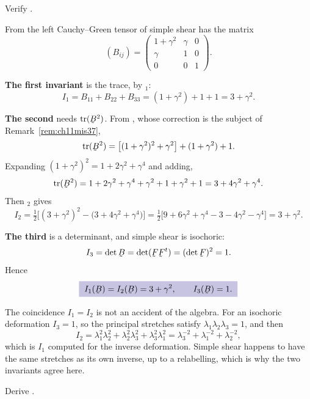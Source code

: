 \begin{problem}
Verify .
\end{problem}

\begin{solution}
From  the left Cauchy--Green tensor of simple shear has the
matrix
\[
   (B_{ij})=\begin{pmatrix}1+\gamma^{2}&\gamma&0\\
   \gamma&1&0\\ 0&0&1\end{pmatrix}.
\]

\textbf{The first invariant} is the trace, by $_{1}$:
\[
   I_{1}=B_{11}+B_{22}+B_{33}=(1+\gamma^{2})+1+1=3+\gamma^{2}.
\]

\textbf{The second} needs $\tr(\bB^{2})$. From , whose
correction is the subject of Remark~\ref{rem:ch11mis37},
\[
   \tr(\bB^{2})=\big[(1+\gamma^{2})^{2}+\gamma^{2}\big]
   +(1+\gamma^{2})+1 .
\]
Expanding $(1+\gamma^{2})^{2}=1+2\gamma^{2}+\gamma^{4}$ and adding,
\[
   \tr(\bB^{2})=1+2\gamma^{2}+\gamma^{4}+\gamma^{2}+1+\gamma^{2}+1
   =3+4\gamma^{2}+\gamma^{4}.
\]
Then $_{2}$ gives
\[
   I_{2}=\tfrac12\big[(3+\gamma^{2})^{2}
   -\big(3+4\gamma^{2}+\gamma^{4}\big)\big]
   =\tfrac12\big[9+6\gamma^{2}+\gamma^{4}
   -3-4\gamma^{2}-\gamma^{4}\big]=3+\gamma^{2}.
\]

\textbf{The third} is a determinant, and simple shear is isochoric:
\[
   I_{3}=\det\bB=\det(\bF\bF^{t})=(\det\bF)^{2}=1 .
\]
Hence
\[
   \boxed{\;I_{1}(\bB)=I_{2}(\bB)=3+\gamma^{2},\qquad I_{3}(\bB)=1 .\;}
\]

The coincidence $I_{1}=I_{2}$ is not an accident of the algebra. For an
isochoric deformation $I_{3}=1$, so the principal stretches satisfy
$\lambda_{1}\lambda_{2}\lambda_{3}=1$, and then
\[
   I_{2}=\lambda^{2}_{1}\lambda^{2}_{2}+\lambda^{2}_{2}\lambda^{2}_{3}
   +\lambda^{2}_{3}\lambda^{2}_{1}
   =\lambda^{-2}_{3}+\lambda^{-2}_{1}+\lambda^{-2}_{2},
\]
which is $I_{1}$ computed for the inverse deformation. Simple shear
happens to have the same stretches as its own inverse, up to a
relabelling, which is why the two invariants agree here.
\end{solution}

\begin{problem}
Derive .
\end{problem}

